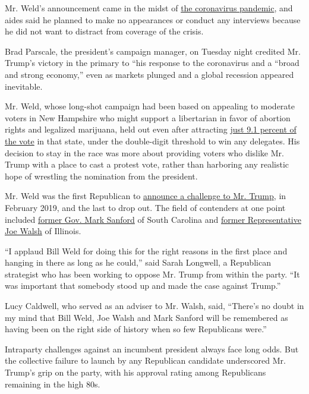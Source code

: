 Mr. Weld's announcement came in the midst of
\href{https://www.nytimes.com/2020/03/18/world/coronavirus-news.html}{the
coronavirus pandemic}, and aides said he planned to make no appearances
or conduct any interviews because he did not want to distract from
coverage of the crisis.

Brad Parscale, the president's campaign manager, on Tuesday night
credited Mr. Trump's victory in the primary to ``his response to the
coronavirus and a ``broad and strong economy,'' even as markets plunged
and a global recession appeared inevitable.

Mr. Weld, whose long-shot campaign had been based on appealing to
moderate voters in New Hampshire who might support a libertarian in
favor of abortion rights and legalized marijuana, held out even after
attracting
\href{https://www.nytimes.com/interactive/2020/02/11/us/elections/results-new-hampshire-republican-primary.html}{just
9.1 percent of the vote} in that state, under the double-digit threshold
to win any delegates. His decision to stay in the race was more about
providing voters who dislike Mr. Trump with a place to cast a protest
vote, rather than harboring any realistic hope of wrestling the
nomination from the president.

Mr. Weld was the first Republican to
\href{https://www.nytimes.com/2019/02/15/us/politics/bill-weld-trump-2020.html}{announce
a challenge to Mr. Trump}, in February 2019, and the last to drop out.
The field of contenders at one point included
\href{https://www.nytimes.com/2019/11/12/us/politics/mark-sanford-2020.html}{former
Gov. Mark Sanford} of South Carolina and
\href{https://www.nytimes.com/2020/02/07/us/politics/joe-walsh-drops-out.html}{former
Representative Joe Walsh} of Illinois.

``I applaud Bill Weld for doing this for the right reasons in the first
place and hanging in there as long as he could,'' said Sarah Longwell, a
Republican strategist who has been working to oppose Mr. Trump from
within the party. ``It was important that somebody stood up and made the
case against Trump.''

Lucy Caldwell, who served as an adviser to Mr. Walsh, said, ``There's no
doubt in my mind that Bill Weld, Joe Walsh and Mark Sanford will be
remembered as having been on the right side of history when so few
Republicans were.''

Intraparty challenges against an incumbent president always face long
odds. But the collective failure to launch by any Republican candidate
underscored Mr. Trump's grip on the party, with his approval rating
among Republicans remaining in the high 80s.

